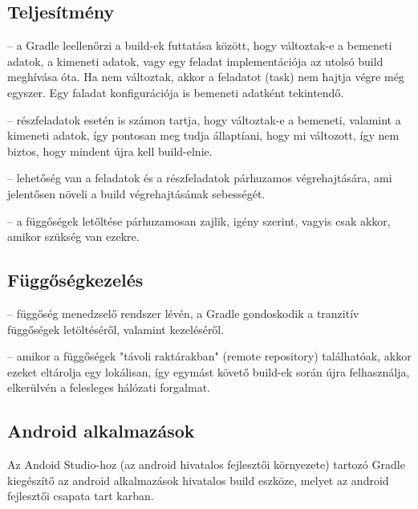 \subsection{Teljesítmény}

\begin{description}
	\setlength{\itemsep}{0.04mm}
	\item[Inkrementális build] -- a Gradle leellenőrzi a build-ek futtatása között, hogy változtak-e a bemeneti adatok, a kimeneti adatok, vagy egy feladat implementációja az utolsó build meghívása óta. Ha nem változtak, akkor a feladatot (task) nem hajtja végre még egyszer. Egy faladat konfigurációja is bemeneti adatként tekintendő.
	\item[Inktrementális részfeladatok] -- részfeladatok esetén is számon tartja, hogy változtak-e a bemeneti, valamint a kimeneti adatok, így pontosan meg tudja állaptíani, hogy mi változott, így nem biztos, hogy mindent újra kell build-elnie.
	\item[Párhuzamos végrehajtás] -- lehetőség van a feladatok és a részfeladatok párhuzamos végrehajtására, ami jelentősen növeli a build végrehajtásának sebességét.
	\item[Függőségek párhuzamos letöltése] -- a függőségek letőltése párhuzamosan zajlik, igény szerint, vagyis csak akkor, amikor szükség van ezekre.
\end{description}

\subsection{Függőségkezelés}

\begin{description}
	\setlength{\itemsep}{0.04mm}
	\item[Tranzitív függőségek] -- függőség menedzselő rendszer lévén, a Gradle gondoskodik a tranzitív függőségek letöltéséről, valamint kezeléséről.
	\item[Külső függőségek] -- amikor a függőségek "távoli raktárakban" (remote repository) találhatóak, akkor ezeket eltárolja egy lokálisan, így egymást követő build-ek során újra felhasználja, elkerülvén a felesleges hálózati forgalmat.
\end{description}

\subsection{Android alkalmazások}

Az Andoid Studio-hoz (az android hivatalos fejlesztői környezete) tartozó Gradle kiegészítő az android alkalmazások hivatalos build eszköze, melyet az android fejlesztői csapata tart karban.

